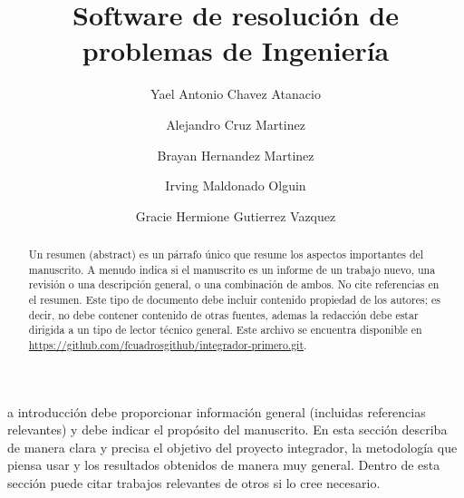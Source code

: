 \documentclass{IEEEcsmag}
\begin{document}

\title{Software de resolución de problemas de Ingeniería }

\author{Yael Antonio Chavez Atanacio}

\author{Alejandro Cruz Martinez}

\author{Brayan Hernandez Martinez}

\author{Irving Maldonado Olguin}

\author{Gracie Hermione Gutierrez Vazquez}



\begin{abstract}
Un resumen (abstract) es un párrafo único que resume los aspectos importantes del manuscrito. A menudo indica si el manuscrito es un informe de un trabajo nuevo, una revisión o una descripción general, o una combinación de ambos. No cite referencias en el resumen. Este tipo de documento debe incluir contenido propiedad de los autores; es decir, no debe contener contenido de otras fuentes, ademas la redacción debe  estar dirigida a un tipo de lector técnico general. Este archivo se encuentra disponible en \href{https://github.com/fcuadrosgithub/integrador-primero.git}{https://github.com/fcuadrosgithub/integrador-primero.git}.
\end{abstract}

\maketitle
{}a introducción debe proporcionar información general (incluidas referencias relevantes) y debe indicar el propósito del manuscrito. En esta sección describa de manera clara y precisa el objetivo del proyecto integrador, la metodología que piensa usar y los resultados obtenidos de manera muy general. Dentro de esta sección puede citar trabajos relevantes de otros si lo cree necesario.
\end{document}
